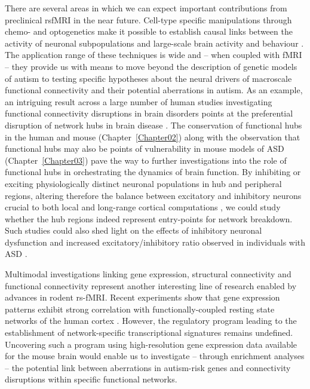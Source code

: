 There are several areas in which we can expect important contributions from
preclinical rsfMRI in the near future. Cell-type specific manipulations through
chemo- and optogenetics make it possible to establish causal links between the
activity of neuronal subpopulations and large-scale brain activity and behaviour
\parencite{deisseroth2015, roth2016}. The application range of these techniques
is wide and -- when coupled with fMRI \parencite{giorgi2017, grayson2016} --
they provide us with means to move beyond the description of genetic models of
autism to testing specific hypotheses about the neural drivers of macroscale
functional connectivity and their potential aberrations in autism. As an
example, an intriguing result across a large number of human studies
investigating functional connectivity disruptions in brain disorders points at
the preferential disruption of network hubs in brain disease
\parencite{crossley2014}. The conservation of functional hubs in the human and
mouse (Chapter~\ref{Chapter02}) along with the observation that functional hubs
may also be points of vulnerability in mouse models of ASD
(Chapter~\ref{Chapter03}) pave the way to further investigations into the role
of functional hubs in orchestrating the dynamics of brain function. By
inhibiting or exciting physiologically distinct neuronal populations in hub and
peripheral regions, altering therefore the balance between excitatory and
inhibitory neurons crucial to both local and long-range cortical computations
\parencite{anticevic2017, krystal2017}, we could study whether the hub regions
indeed represent entry-points for network breakdown. Such studies could also
shed light on the effects of inhibitory neuronal dysfunction and increased
excitatory/inhibitory ratio observed in individuals with ASD
\parencite{marin2012}. 

Multimodal investigations linking gene expression, structural connectivity and
functional connectivity represent another interesting line of research enabled
by advances in rodent rs-fMRI. Recent experiments show that gene expression
patterns exhibit strong correlation with functionally-coupled resting state
networks of the human cortex \parencite{richiardi2015, konopka2017, wang2015}.
However, the regulatory program leading to the establishment of network-specific
transcriptional signatures remains undefined. Uncovering such a program using
high-resolution gene expression data available for the mouse brain would
enable us to investigate -- through enrichment analyses -- the potential link 
between aberrations in autism-risk genes and connectivity
disruptions within specific functional networks.
